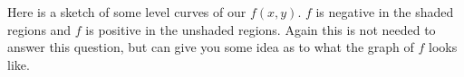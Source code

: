 \begin{eg}[$f(x,y) = xy(5x+y-15)$]
Here is a sketch of some level curves of our $f(x,y)$. $f$ is negative
in the shaded regions and $f$ is positive in the unshaded regions.
Again this is not needed to answer this question, but can give you
some idea as to what the graph of $f$ looks like.

\end{eg}
\goodbreak

